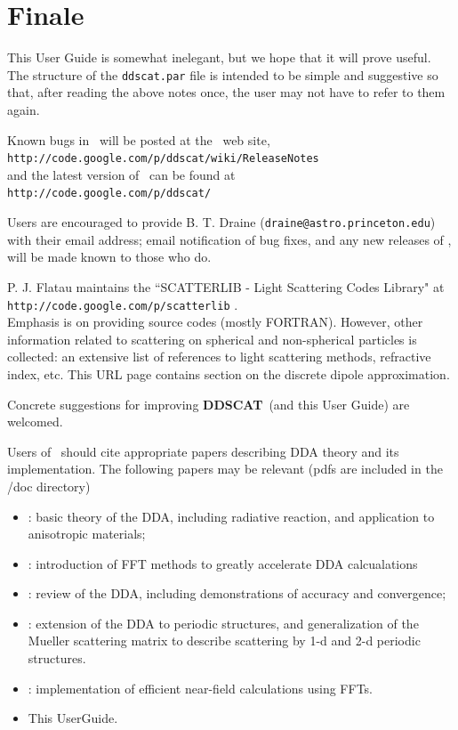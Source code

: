 \section{Finale}

This User Guide is somewhat inelegant, but we hope that it will prove
useful.  The structure of the {\tt ddscat.par} file is intended to be
simple and suggestive so that, after reading the above notes once, the
user may not have to refer to them again.

Known bugs in
\ddscat\ will be posted 
at the \ddscat\ web site,\\
{\tt http://code.google.com/p/ddscat/wiki/ReleaseNotes}\\
and the latest version of \ddscat\ can be found at\\
{\tt http://code.google.com/p/ddscat/}

\medskip
Users are encouraged to provide B. T. Draine 
({\tt draine@astro.princeton.edu}) with their
email address; email notification of bug fixes,
and any new releases of \ddscat, 
will be made known to those who do.

P. J. Flatau maintains the  
``SCATTERLIB - Light Scattering Codes Library"
at\\
{\tt http://code.google.com/p/scatterlib} .\\
Emphasis is on providing source
codes (mostly FORTRAN). However, other information related to scattering 
on spherical and
non-spherical particles is collected: an extensive list of references 
to light scattering methods, refractive index, etc. 
This URL page contains section on the discrete dipole approximation.

\medskip
Concrete suggestions for improving {{\bf DDSCAT}}\ (and this User Guide) are
welcomed.

\medskip
Users of \ddscat\ should cite appropriate papers describing DDA theory and its
implementation.  The following papers may be relevant
(pdfs are included in the /doc directory)
\begin{itemize}
\item \citet{Draine_1988}: 
basic theory of the DDA, including radiative reaction, and application to
anisotropic materials;
\item \citet{Goodman+Draine+Flatau_1990}: introduction of FFT methods to greatly
accelerate DDA calcualations
\item \citet{Draine+Flatau_1994}: review of the DDA, including 
demonstrations of accuracy and convergence;
\item \citet{Draine+Flatau_2008a}: extension of the DDA to periodic
structures, and generalization of the Mueller scattering matrix to
describe scattering by 1-d and 2-d periodic structures.
\item \citet{Flatau+Draine_2012}: implementation of efficient
near-field calculations using FFTs.
\item This UserGuide.
\end{itemize}

